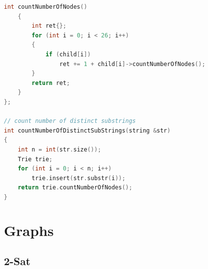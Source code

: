 \documentclass[10pt,landscape,a4paper,twocolumn]{article}
\begin{document}
\begin{lstlisting}[language=C++]
    int countNumberOfNodes()
    {
        int ret{};
        for (int i = 0; i < 26; i++)
        {
            if (child[i])
                ret += 1 + child[i]->countNumberOfNodes();
        }
        return ret;
    }
};

// count number of distinct substrings
int countNumberOfDistinctSubStrings(string &str)
{
    int n = int(str.size());
    Trie trie;
    for (int i = 0; i < n; i++)
        trie.insert(str.substr(i));
    return trie.countNumberOfNodes();
}

\end{lstlisting}
\section{Graphs}
\subsection{2-Sat}
\end{document}
